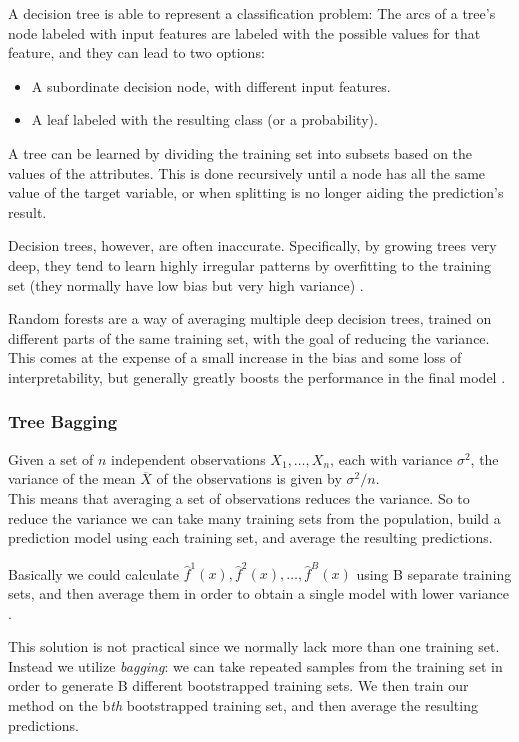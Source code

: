 A decision tree is able to represent a classification problem:
The arcs of a tree's node labeled with input features are labeled with the possible values for that feature, and they can lead to two options:
\begin{itemize}[noitemsep]
	\item A subordinate decision node, with different input features.
	\item A leaf labeled with the resulting class (or a probability).
\end{itemize}

A tree can be learned by dividing the training set into subsets based on the values of the attributes. This is done recursively until a node has all the same value of the target variable, or when splitting is no longer aiding the prediction's result.

Decision trees, however, are often inaccurate. Specifically, by growing trees very deep, they tend to learn highly irregular patterns by overfitting to the training set (they normally have low bias but very high variance) \cite{ESL}. 

Random forests are a way of averaging multiple deep decision trees, trained on different parts of the same training set, with the goal of reducing the variance. \\
This comes at the expense of a small increase in the bias and some loss of interpretability, but generally greatly boosts the performance in the final model \cite{ESL}. 

\subsubsection{Tree Bagging}
Given a set of $n$ independent observations $X_1, \dots, X_n$, each with variance $\sigma^2$, the variance of the mean $\overline{X}$ of the observations is given by $\sigma^2/n$. \\
This means that averaging a set of observations reduces the variance. So to reduce the variance we can take many training sets from the population, build a prediction model using each training set, and average the resulting predictions. 

Basically we could calculate $\hat{f}^1(x), \hat{f}^2(x), \dots, \hat{f}^B(x)$ using B separate training sets, and then average them in order to obtain a single model with lower variance \cite{ISLR}.

This solution is not practical since we normally lack more than one training set. \\
Instead we utilize \textit{bagging}: we can take repeated samples from the training set in order to generate B different bootstrapped training sets. We then train our method on the b\textit{th} bootstrapped training set, and then average the resulting predictions.

